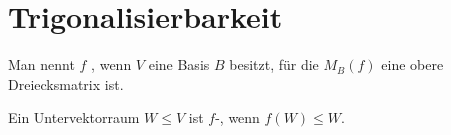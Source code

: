 \section{Trigonalisierbarkeit}

\begin{definition}
	Man nennt $f$ , wenn $V$ eine Basis $B$ besitzt, für die $M_B(f)$ eine obere Dreiecksmatrix ist.
\end{definition}

\begin{definition}[invariant]
	Ein Untervektorraum $W\le V$ ist $f$-, wenn $f(W)\le W$.
\end{definition}